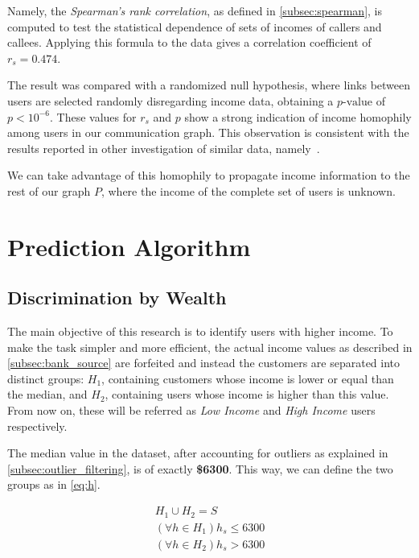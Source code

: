 Namely, the \textit{Spearman's rank correlation}, as defined in \cref{subsec:spearman}, is computed to test the statistical dependence of sets of incomes of callers and callees. Applying this formula to the data gives a correlation coefficient of $r_s = 0.474$.

The result was compared with a randomized null hypothesis, where links between users are selected randomly disregarding income data, obtaining a $p\text{-value}$ of $p < 10^{-6}$. These values for $r_s$ and $p$ show a strong indication of income homophily among users in our communication graph. This observation is consistent with the results reported in other investigation of similar data, namely~\cite{leo2015socioeconomic}.

We can take advantage of this homophily to propagate income information to the rest of our graph $P$, where the income of the complete set of users is unknown.

\section{Prediction Algorithm}
\label{subsec:prediction_algorithm}

\subsection{Discrimination by Wealth}
\label{subsec:discrimination_by_wealth}

The main objective of this research is to identify users with higher income. To make the task simpler and more efficient, the actual income values as described in \cref{subsec:bank_source} are forfeited and instead the customers are separated into distinct groups: $H_1$, containing customers whose income is lower or equal than the median, and $H_2$, containing users whose income is higher than this value. From now on, these will be referred as \emph{Low Income} and \emph{High Income} users respectively.

The median value in the dataset, after accounting for outliers as explained in \cref{subsec:outlier_filtering}, is of exactly \textbf{\$6300}. This way, we can define the two groups as in \cref{eq:h}.

\begin{equation}
\label{eq:h}
\begin{gathered}
H_1 \cup H_2 = S \\
\left( \forall h \in H_1 \right) h_s \leq 6300 \\
\left( \forall h \in H_2 \right) h_s > 6300
\end{gathered}
\end{equation}

